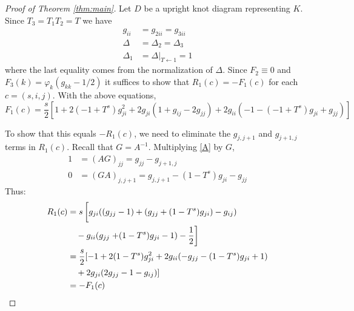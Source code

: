 \documentclass[10pt,a4paper]{amsart}
\begin{document}
\begin{proof}[Proof of Theorem \ref{thm:main}]
    Let $D$ be a upright knot diagram representing $K$.
    Since $T_3=T_1T_2=T$ we have
\begin{align*}g_{ii}&=g_{2ii}=g_{3ii}\\
\Delta&=\Delta_2=\Delta_3\\
\Delta_1&=\Delta|_{T\leftarrow1}=1
\end{align*}
where the last equality comes from the normalization of $\Delta$. Since $F_2\equiv0$
and $F_3(k)=\varphi_k(g_{kk}-1/2)$ 
it suffices to show that $R_1(c)=-F_1(c)$ for each $c=(s,i,j)$.
With the above equations,
\begin{equation*}
    F_1(c)=\frac{s}{2}[1+2(-1+T^s)g^2_{ji}+2g_{ji}(1+g_{ij}-2g_{jj})+2g_{ii}(-1-(-1+T^s)g_{ji}+g_{jj})] \label{eq:f1}
\end{equation*}

To show that this equals $-R_1(c)$, we need to eliminate the
$g_{j,j+1}$ and $g_{j+1,j}$ terms in $R_1(c)$.
Recall that $G=A^{-1}$. Multiplying \eqref{A} by $G$,
\begin{align*}
1&=(AG)_{jj}=g_{jj}-g_{j+1,j}\\
0&=(GA)_{j,j+1}=g_{j,j+1}-(1-T^s)g_{ji}-g_{jj}\end{align*}
Thus:
\begin{align*}
    R_1(c)&=s\left[\vphantom{\frac12}g_{ji}((g_{jj}-1)+(g_{jj}+(1-T^s)g_{ji})-g_{ij})\right.\\
    &\quad-g_{ii}(g_{jj}
    \left.+(1-T^s)g_{ji}-1)-\frac{1}{2}\right]\\
        &= \frac{s}{2}[-1+2(1-T^s)g_{ji}^2+2g_{ii}(-g_{jj}-(1-T^s)g_{ji}+1)\\
        &\quad+2g_{ji}(2g_{jj}-1-g_{ij})]\\
        &= -F_1(c)
\end{align*}
\end{proof}
\end{document}
